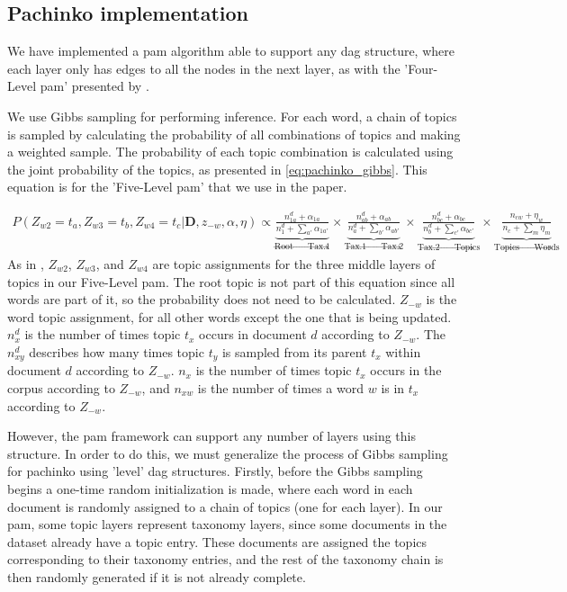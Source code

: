 \subsection{Pachinko implementation}\label{sec:pam_gibbs}
We have implemented a \acrfull{pam} algorithm able to support any \gls{dag} structure, where each layer only has edges to all the nodes in the next layer, as with the 'Four-Level \gls{pam}' presented by \citet{li2006pachinko}.

We use Gibbs sampling for performing inference.
For each word, a chain of topics is sampled by calculating the probability of all combinations of topics and making a weighted sample.
The probability of each topic combination is calculated using the joint probability of the topics, as presented in \autoref{eq:pachinko_gibbs}. This equation is for the 'Five-Level \gls{pam}' that we use in the paper.

\begin{equation}\label{eq:pachinko_gibbs}
	\begin{split}
		P(Z_{w2} = t_a, Z_{w3} = t_b, Z_{w4} = t_c | \textbf{D}, z_{-w}, \alpha, \eta) \propto
		\underbrace{\frac{n_{1a}^d + \alpha_{1a}}{n_1^d + \sum_{a'} \alpha_{1a'}}}_{\text{Root $\rightarrow$ Tax.1}} \times
		\underbrace{\frac{n_{ab}^d + \alpha_{ab}}{n_a^d + \sum_{b'} \alpha_{ab'}}}_{\text{Tax.1 $\rightarrow$ Tax.2}}  \times 
		\underbrace{\frac{n_{bc}^d + \alpha_{bc}}{n_{b}^d + \sum_{c'} \alpha_{bc'}}}_{\text{Tax.2 $\rightarrow$ Topics}} \times 
		\underbrace{\frac{n_{cw} + \eta_{w}}{n_{c} + \sum_{m} \eta_{m}}}_{\text{Topics $\rightarrow$ Words}} 
	\end{split}
\end{equation}
As in \citet{li2006pachinko}, $Z_{w2}$, $Z_{w3}$, and $Z_{w4}$ are topic assignments for the three middle layers of topics in our Five-Level \gls{pam}.
The root topic is not part of this equation since all words are part of it, so the probability does not need to be calculated.
$Z_{-w}$ is the word topic assignment, for all other words except the one that is being updated.
$n_x^d$ is the number of times topic $t_x$ occurs in document $d$ according to $Z_{-w}$. 
The $n_{xy}^d$ describes how many times topic $t_y$ is sampled from its parent $t_x$ within document $d$ according to $Z_{-w}$.
$n_x$ is the number of times topic $t_x$ occurs in the corpus according to $Z_{-w}$, and $n_{xw}$ is the number of times a word $w$ is in $t_x$ according to $Z_{-w}$.

However, the \gls{pam} framework can support any number of layers using this structure.
In order to do this, we must generalize the process of Gibbs sampling for pachinko using 'level' \gls{dag} structures.
Firstly, before the Gibbs sampling begins a one-time random initialization is made, where each word in each document is randomly assigned to a chain of topics (one for each layer).
In our \gls{pam}, some topic layers represent taxonomy layers, since some documents in the dataset already have a topic entry.
These documents are assigned the topics corresponding to their taxonomy entries, and the rest of the taxonomy chain is then randomly generated if it is not already complete.

